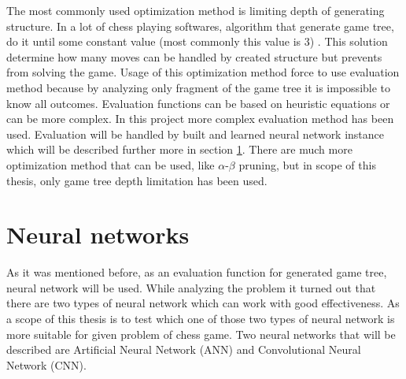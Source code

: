     The most commonly used optimization method is limiting depth of generating structure. In a lot of chess playing softwares, algorithm that generate game tree, do it until some constant value (most commonly this value is $3$) \cite{bib:internet-alphazero,bib:book-search-for-solutions-in-games,bib:article-optimal-on-game-trees}. This solution determine how many moves can be handled by created structure but prevents from solving the game. Usage of this optimization method force to use evaluation method because by analyzing only fragment of the game tree it is impossible to know all outcomes. Evaluation functions can be based on heuristic equations \cite{bib:conference-heuristic-evaluation-chessai} or can be more complex. In this project more complex evaluation method has been used. Evaluation will be handled by built and learned neural network instance which will be described further more in section \ref{sec:neural-networks}. There are much more optimization method that can be used, like $\alpha$-$\beta$ pruning, but in scope of this thesis, only game tree depth limitation has been used. 


    \section{Neural networks}\label{sec:neural-networks}
    As it was mentioned before, as an evaluation function for generated game tree, neural network will be used. While analyzing the problem it turned out that there are two types of neural network which can work with good effectiveness. As a scope of this thesis is to test which one of those two types of neural network is more suitable for given problem of chess game. Two neural networks that will be described are Artificial Neural Network (ANN) and Convolutional Neural Network (CNN).


